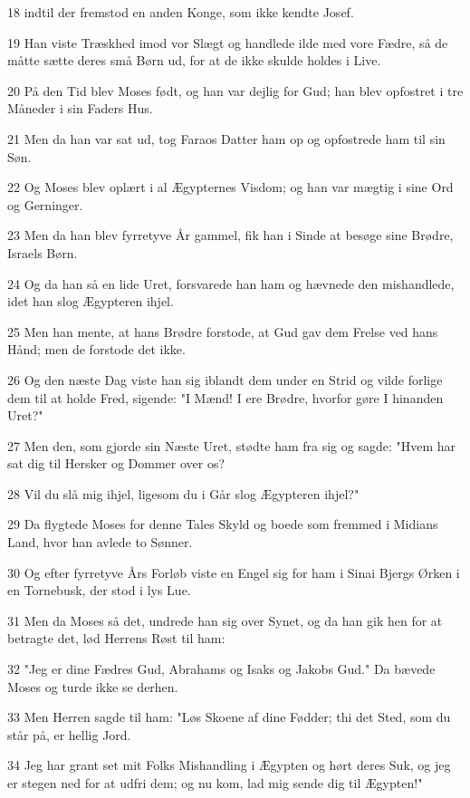 \par 18 indtil der fremstod en anden Konge, som ikke kendte Josef.
\par 19 Han viste Træskhed imod vor Slægt og handlede ilde med vore Fædre, så de måtte sætte deres små Børn ud, for at de ikke skulde holdes i Live.
\par 20 På den Tid blev Moses født, og han var dejlig for Gud; han blev opfostret i tre Måneder i sin Faders Hus.
\par 21 Men da han var sat ud, tog Faraos Datter ham op og opfostrede ham til sin Søn.
\par 22 Og Moses blev oplært i al Ægypternes Visdom; og han var mægtig i sine Ord og Gerninger.
\par 23 Men da han blev fyrretyve År gammel, fik han i Sinde at besøge sine Brødre, Israels Børn.
\par 24 Og da han så en lide Uret, forsvarede han ham og hævnede den mishandlede, idet han slog Ægypteren ihjel.
\par 25 Men han mente, at hans Brødre forstode, at Gud gav dem Frelse ved hans Hånd; men de forstode det ikke.
\par 26 Og den næste Dag viste han sig iblandt dem under en Strid og vilde forlige dem til at holde Fred, sigende: "I Mænd! I ere Brødre, hvorfor gøre I hinanden Uret?"
\par 27 Men den, som gjorde sin Næste Uret, stødte ham fra sig og sagde: "Hvem har sat dig til Hersker og Dommer over os?
\par 28 Vil du slå mig ihjel, ligesom du i Går slog Ægypteren ihjel?"
\par 29 Da flygtede Moses for denne Tales Skyld og boede som fremmed i Midians Land, hvor han avlede to Sønner.
\par 30 Og efter fyrretyve Års Forløb viste en Engel sig for ham i Sinai Bjergs Ørken i en Tornebusk, der stod i lys Lue.
\par 31 Men da Moses så det, undrede han sig over Synet, og da han gik hen for at betragte det, lød Herrens Røst til ham:
\par 32 "Jeg er dine Fædres Gud, Abrahams og Isaks og Jakobs Gud." Da bævede Moses og turde ikke se derhen.
\par 33 Men Herren sagde til ham: "Løs Skoene af dine Fødder; thi det Sted, som du står på, er hellig Jord.
\par 34 Jeg har grant set mit Folks Mishandling i Ægypten og hørt deres Suk, og jeg er stegen ned for at udfri dem; og nu kom, lad mig sende dig til Ægypten!"
